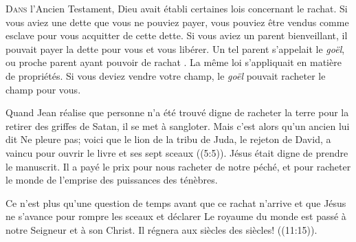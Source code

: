 \dvrule







\lettrine{D}{ans} l'Ancien Testament,
 Dieu avait établi certaines lois concernant le rachat.
 Si vous aviez une dette que vous ne pouviez payer,
 vous pouviez être vendus comme esclave pour vous acquitter
 de cette dette. Si vous aviez un parent bienveillant,
 il pouvait payer la dette pour vous et vous libérer.
 Un tel parent s'appelait le \emph{goël}, 
 ou \Og proche parent ayant pouvoir de rachat \Fg{}.
 La même loi s'appliquait en matière de propriétés.
 Si vous deviez vendre votre champ, le \emph{goël}
 pouvait racheter le champ pour vous. 

Quand Jean réalise que personne n'a été trouvé digne de racheter
 la terre pour la retirer des griffes de Satan, il se met à sangloter.
 Mais c'est alors qu'un ancien lui dit\frcolon{} 
 \Og Ne pleure pas; voici que le lion de la tribu de Juda,
 le rejeton de David, a vaincu pour ouvrir le livre et ses sept sceaux \Fg{}
 ((5:5)).
 Jésus était digne de prendre le manuscrit. Il a payé le prix
 pour nous racheter de notre péché, et pour racheter le monde
 de l'emprise des puissances des ténèbres. 


Ce n'est plus qu'une question de temps avant que ce rachat n'arrive
 et que Jésus ne s'avance pour rompre les sceaux et déclarer\frcolon{} 
 \Og Le royaume du monde est passé à notre Seigneur et à son Christ.
 Il régnera aux siècles des siècles! \Fg{} ((11:15)). 

\dvrule



